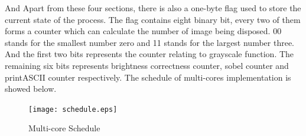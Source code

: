 \documentclass[conference,compsoc]{IEEEtran}
\begin{document}
      \par And Apart from these four sections, there is also a one-byte flag used to store the current state of the process. The flag contains eight binary bit, every two of them forms a counter which can calculate the number of image being disposed. 00 stands for the smallest number zero and 11 stands for the largest number three. And the first two bits represents the counter relating to grayscale function. The remaining six bits represents brightness correctness counter, sobel counter and printASCII counter respectively. The schedule of multi-cores implementation is showed below.
      \begin{figure}[h]
        \centering
        \texttt{[image: schedule.eps]}
        \caption{Multi-core Schedule}	
        \end{figure}
  
    
    
    
\end{document}
